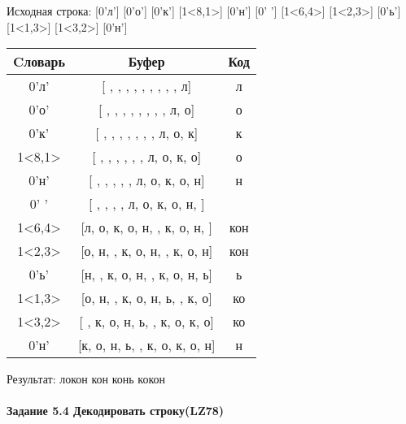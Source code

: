 \documentclass[a4paper, 12pt]{article}
\begin{document}
Исходная строка: [0'л'] [0'о'] [0'к'] [1<8,1>] [0'н'] [0' '] [1<6,4>] [1<2,3>] [0'ь'] [1<1,3>] [1<3,2>] [0'н']\\
\begin{table}[h!]
\centering
\begin{tabular}{|c|c|c|}
\hline
 Cловарь & Буфер & Код  \\ \hline
0'л' & [ ,  ,  ,  ,  ,  ,  ,  ,  , л] & л
\\ \hline
0'о' & [ ,  ,  ,  ,  ,  ,  ,  , л, о] & о
\\ \hline
0'к' & [ ,  ,  ,  ,  ,  ,  , л, о, к] & к
\\ \hline
1<8,1> & [ ,  ,  ,  ,  ,  , л, о, к, о] & о
\\ \hline
0'н' & [ ,  ,  ,  ,  , л, о, к, о, н] & н
\\ \hline
0' ' & [ ,  ,  ,  , л, о, к, о, н,  ] &  
\\ \hline
1<6,4> & [л, о, к, о, н,  , к, о, н,  ] & кон 
\\ \hline
1<2,3> & [о, н,  , к, о, н,  , к, о, н] & кон
\\ \hline
0'ь' & [н,  , к, о, н,  , к, о, н, ь] & ь
\\ \hline
1<1,3> & [о, н,  , к, о, н, ь,  , к, о] &  ко
\\ \hline
1<3,2> & [ , к, о, н, ь,  , к, о, к, о] & ко
\\ \hline
0'н' & [к, о, н, ь,  , к, о, к, о, н] & н
\\ \hline
\end{tabular}
\end{table}

Результат: локон кон конь кокон
\pagebreak
\paragraph{Задание 5.4 Декодировать строку(LZ78)\\}
\end{document}
